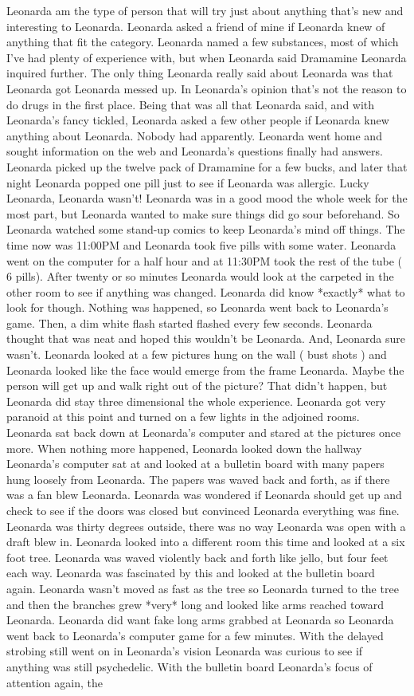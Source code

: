 \documentclass[12pt]{book}
\begin{document}
Leonarda am the type of person that will try just about anything that's new and interesting to Leonarda. Leonarda asked a friend of mine if Leonarda knew of anything that fit the category. Leonarda named a few substances, most of which I've had plenty of experience with, but when Leonarda said Dramamine Leonarda inquired further. The only thing Leonarda really said about Leonarda was that Leonarda got Leonarda messed up. In Leonarda's opinion that's not the reason to do drugs in the first place. Being that was all that Leonarda said, and with Leonarda's fancy tickled, Leonarda asked a few other people if Leonarda knew anything about Leonarda. Nobody had apparently. Leonarda went home and sought information on the web and Leonarda's questions finally had answers. Leonarda picked up the twelve pack of Dramamine for a few bucks, and later that night Leonarda popped one pill just to see if Leonarda was allergic. Lucky Leonarda, Leonarda wasn't! Leonarda was in a good mood the whole week for the most part, but Leonarda wanted to make sure things did go sour beforehand. So Leonarda watched some stand-up comics to keep Leonarda's mind off things. The time now was 11:00PM and Leonarda took five pills with some water. Leonarda went on the computer for a half hour and at 11:30PM took the rest of the tube ( 6 pills). After twenty or so minutes Leonarda would look at the carpeted in the other room to see if anything was changed. Leonarda did know *exactly* what to look for though. Nothing was happened, so Leonarda went back to Leonarda's game. Then, a dim white flash started flashed every few seconds. Leonarda thought that was neat and hoped this wouldn't be Leonarda. And, Leonarda sure wasn't. Leonarda looked at a few pictures hung on the wall ( bust shots ) and Leonarda looked like the face would emerge from the frame Leonarda. Maybe the person will get up and walk right out of the picture? That didn't happen, but Leonarda did stay three dimensional the whole experience. Leonarda got very paranoid at this point and turned on a few lights in the adjoined rooms. Leonarda sat back down at Leonarda's computer and stared at the pictures once more. When nothing more happened, Leonarda looked down the hallway Leonarda's computer sat at and looked at a bulletin board with many papers hung loosely from Leonarda. The papers was waved back and forth, as if there was a fan blew Leonarda. Leonarda was wondered if Leonarda should get up and check to see if the doors was closed but convinced Leonarda everything was fine. Leonarda was thirty degrees outside, there was no way Leonarda was open with a draft blew in. Leonarda looked into a different room this time and looked at a six foot tree. Leonarda was waved violently back and forth like jello, but four feet each way. Leonarda was fascinated by this and looked at the bulletin board again. Leonarda wasn't moved as fast as the tree so Leonarda turned to the tree and then the branches grew *very* long and looked like arms reached toward Leonarda. Leonarda did want fake long arms grabbed at Leonarda so Leonarda went back to Leonarda's computer game for a few minutes. With the delayed strobing still went on in Leonarda's vision Leonarda was curious to see if anything was still psychedelic. With the bulletin board Leonarda's focus of attention again, the 
\end{document}
